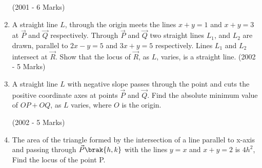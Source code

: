 \begin{enumerate}
\hfill{(2001 - 6 Marks)}

\item A straight line $L$, through the origin meets the lines $x+y=1$ and $x+y=3$ at $\vec{P}$ and $\vec{Q}$ respectively. Through $\vec{P}$ and $\vec{Q}$ two 
	straight lines $L_{1}$, and $L_{2}$ are drawn, parallel to $2x-y=5$ and $3x+y=5$ respectively. Lines $L_{1}$ and $L_{2}$ intersect at $\vec{R}$. Show 
		that the locus of $\vec{R}$, as $L$, varies, is a straight line. 
\hfill{(2002 - 5 Marks)}

\item A straight line $L$ with negative slope passes through the 
point  and cuts the positive coordinate axes at points 
		$\vec{P}$ and $\vec{Q}$. Find the absolute minimum value of $OP + OQ$, as $L$ 
varies, where $O$ is the origin.

\hfill{(2002 - 5 Marks)}

\item The area of the triangle formed by the intersection of a line 
	parallel to x-axis and passing through $\vec{P}\brak{h, k}$ with the lines 
$y=x$ and $x+y=2$ is $4h^{2}$, Find the locus of the point P.


\end{enumerate}
